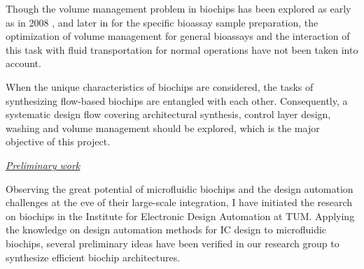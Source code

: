 Though the volume management problem in biochips has been explored as early as in
2008 \cite{AminTVWJ08}, and later in \cite{MitraRBCB14}
for the specific bioassay sample preparation, the optimization of volume management for general
bioassays and the interaction of this task with fluid transportation 
for normal operations have not been taken into account. 

When the unique characteristics of biochips are considered, the tasks of
synthesizing flow-based biochips are entangled with each other. Consequently,
a systematic design flow covering architectural synthesis,
control layer design, washing and volume management should be explored, which is the
major objective of this project. 

\vskip 8pt
\textit{\underline{Preliminary work}}

Observing the great potential of microfluidic biochips and the design
automation challenges at the eve of their large-scale integration, I have 
initiated the research on biochips in the Institute for Electronic Design
Automation at TUM.
Applying the knowledge on design automation methods for IC design to 
microfluidic biochips, 
several preliminary ideas have been verified in our research group 
to synthesize efficient biochip architectures.

